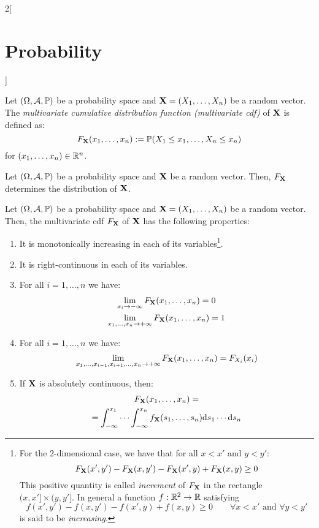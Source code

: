 \documentclass[../../../main.tex]{subfiles}
\begin{document}
\begin{multicols}{2}[\section{Probability}]
\begin{definition}
  \end{definition}
  \begin{definition}
    Let $(\Omega,\mathcal{A},\mathbb{P})$ be a probability space and $\boldsymbol{\mathrm{X}}=(X_1,\ldots,X_n)$ be a random vector. The \textit{multivariate cumulative distribution function (multivariate cdf)} of $\boldsymbol{\mathrm{X}}$ is defined as: $$F_{\boldsymbol{\mathrm{X}}}(x_1,\ldots,x_n):=\mathbb{P}(X_1\leq x_1,\ldots,X_n\leq x_n)$$ for $(x_1,\ldots,x_n)\in\mathbb{R}^n$.
  \end{definition}
  \begin{theorem}
    Let $(\Omega,\mathcal{A},\mathbb{P})$ be a probability space and $\boldsymbol{\mathrm{X}}$ be a random vector. Then, $F_{\boldsymbol{\mathrm{X}}}$ determines the distribution of $\boldsymbol{\mathrm{X}}$.
  \end{theorem}
  \begin{prop}
    Let $(\Omega,\mathcal{A},\mathbb{P})$ be a probability space and $\boldsymbol{\mathrm{X}}=(X_1,\ldots,X_n)$ be a random vector. Then, the multivariate cdf $F_{\boldsymbol{\mathrm{X}}}$ of $\boldsymbol{\mathrm{X}}$ has the following properties:
    \begin{enumerate}
      \item It is monotonically increasing in each of its variables\footnote{For the 2-dimensional case, we have that for all $x<x'$ and $y<y'$: $$F_{\boldsymbol{\mathrm{X}}}(x',y')-F_{\boldsymbol{\mathrm{X}}}(x,y')-F_{\boldsymbol{\mathrm{X}}}(x',y)+F_{\boldsymbol{\mathrm{X}}}(x,y)\geq 0$$ This positive quantity is called \textit{increment} of $F_{\boldsymbol{\mathrm{X}}}$ in the rectangle $(x,x']\times(y,y']$. In general a function $f:\mathbb{R}^2\rightarrow\mathbb{R}$ satisfying $$f(x',y')-f(x,y')-f(x',y)+f(x,y)\geq 0\qquad\forall x<x'\text{ and }\forall y<y'$$ is said to be \textit{increasing}.}.
      \item It is right-continuous in each of its variables.
      \item For all $i=1,\ldots,n$ we have:
            \begin{gather*}
              \lim_{x_i\to-\infty}F_{\boldsymbol{\mathrm{X}}}(x_1,\ldots,x_n)=0\\
              \lim_{x_1,\ldots,x_n\to+\infty}F_{\boldsymbol{\mathrm{X}}}(x_1,\ldots,x_n)=1
            \end{gather*}
      \item For all $i=1,\ldots,n$ we have: $$\lim_{x_1,\ldots,x_{i-1},x_{i+1},\ldots,x_n\to+\infty}F_{\boldsymbol{\mathrm{X}}}(x_1,\ldots,x_n)=F_{X_i}(x_i)$$
      \item If $\boldsymbol{\mathrm{X}}$ is absolutely continuous, then:
            \begin{multline*}
              F_{\vf{X}}(x_1,\ldots,x_n)=\\=\int_{-\infty}^{x_1}\cdots\int_{-\infty}^{x_n} f_{\vf{X}}(s_1,\ldots,s_n)\dd s_1\cdots\dd s_n

\end{multline*}
\end{enumerate}
\end{prop}
\end{multicols}
\end{document}
